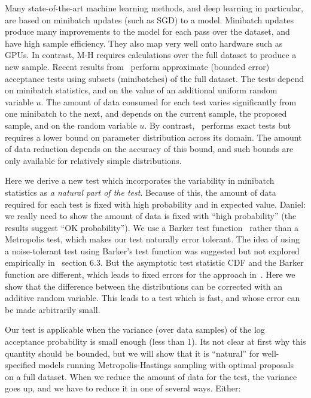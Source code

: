 \documentclass{article}
\begin{document}
Many state-of-the-art machine learning methods, and deep learning in particular,
are based on minibatch updates (such as SGD) to a model.  Minibatch updates
produce many improvements to the model for each pass over the dataset, and have
high sample efficiency. They also map very well onto hardware such as GPUs. In
contrast, M-H requires calculations over the full dataset to produce a new
sample.  Recent results from~\cite{cutting_mh_2014,icml2014c1_bardenet14}
perform approximate (bounded error) acceptance tests using subsets (minibatches)
of the full dataset. The tests depend on minibatch statistics, and on the value
of an additional uniform random variable $u$. The amount of data consumed for
each test varies significantly from one minibatch to the next, and depends on
the current sample, the proposed sample, and on the random variable $u$. By
contrast,~\cite{conf/uai/MaclaurinA14} performs exact tests but requires a lower
bound on parameter distribution across its domain.  The amount of data reduction
depends on the accuracy of this bound, and such bounds are only available for
relatively simple distributions.

Here we derive a new test which incorporates the variability in minibatch
statistics as {\em a natural part of the test}. Because of this, the amount of
data required for each test is fixed with high probability and in expected
value. {\color{blue} Daniel: we really need to show the amount of data is fixed
with ``high probability'' (the results suggest ``OK probability'').} We use a
Barker test function~\cite{Barker65} rather than a Metropolis test, which makes
our test naturally error tolerant. The idea of using a noise-tolerant test using
Barker's test function was suggested but not explored empirically
in~\cite{Bardenet15} section 6.3. But the asymptotic test statistic CDF and the
Barker function are different, which leads to fixed errors for the approach
in~\cite{Bardenet15}. Here we show that the difference between the distributions
can be corrected with an additive random variable. This leads to a test which is
fast, and whose error can be made arbitrarily small.

Our test is applicable when the variance (over data samples) of the log
acceptance probability is small enough (less than 1). Its not clear at first why
this quantity should be bounded, but we will show that it is ``natural'' for
well-specified models running Metropolis-Hastings sampling with optimal
proposals~\cite{OptimalScaling01} on a full dataset. When we reduce the amount
of data for the test, the variance goes up, and we have to reduce it in one of
several ways. Either:
\end{document}
